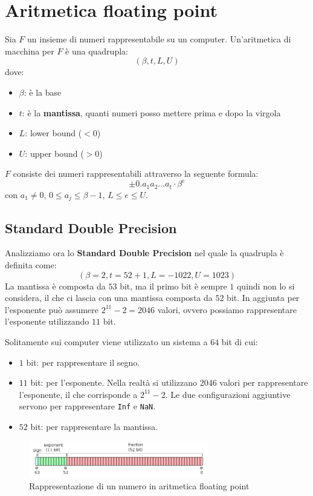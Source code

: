 \section{Aritmetica floating point}
\begin{definizione}
    Sia $F$ un insieme di numeri rappresentabile su un computer. Un'aritmetica
    di macchina per $F$ è una quadrupla:
    \begin{equation}
        (\beta, t, L, U)
    \end{equation}
    dove:
    \begin{itemize}
        \item $\beta$: è la base
        \item $t$: è la \textbf{mantissa}, quanti numeri posso mettere prima e
              dopo la virgola
        \item $L$: lower bound ($< 0$)
        \item $U$: upper bound ($> 0$)
    \end{itemize}
\end{definizione}
$F$ consiste dei numeri rappresentabili attraverso la seguente formula:
\begin{equation}
    \pm 0.a_1a_2\dots a_t\cdot \beta ^e
\end{equation}
con $a_1 \neq 0$, $0 \leq a_j \leq \beta-1$, $L\leq e \leq U$.
\subsection{Standard Double Precision}
Analizziamo ora lo \textbf{Standard Double Precision} nel quale la quadrupla è
definita come:
\begin{equation}
    (\beta = 2, t = 52 + 1, L = -1022, U = 1023)
\end{equation}
La mantissa è composta da $53$ bit, ma il primo bit è sempre $1$ quindi non lo
si considera, il che ci lascia con una mantissa composta da $52$ bit. In aggiunta
per l'esponente può assumere $2^{11} - 2 = 2046$ valori, ovvero possiamo rappresentare
l'esponente utilizzando $11$ bit.

Solitamente sui computer viene utilizzato un sistema a $64$ bit di cui:
\begin{itemize}
    \item $1$ bit: per rappresentare il segno.
    \item $11$ bit: per l'esponente. Nella realtà si utilizzano 2046 valori per
          rappresentare l'esponente, il che corrisponde a $2^{11} - 2$. Le due
          configurazioni aggiuntive servono per rappresentare \texttt{Inf} e
          \texttt{NaN}.
    \item $52$ bit: per rappresentare la mantissa.
\end{itemize}
\begin{figure}[!ht]
    \centering
    \includegraphics[width=0.7\textwidth]{./img/intro/floatnumber.png}
    \caption{Rappresentazione di un numero in aritmetica floating point}
\end{figure}
